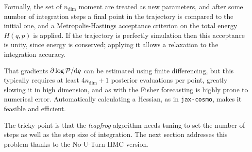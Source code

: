 \documentclass[twocolumn,twocolappendix,nofootinbib]{openjournal}
\newcommand{\jaxcosmo}{\texttt{jax-cosmo}}
\begin{document}
Formally, the set of $n_\mathrm{dim}$ moment are treated as new parameters, and after 
some number of integration steps a final point in the trajectory is compared to the initial one,
and a Metropolis-Hastings acceptance criterion on the total energy $H(q,p)$ is applied. If the trajectory is perfectly simulation then this acceptance is unity, since energy is conserved; applying it allows
a relaxation to the integration accuracy.

That gradients $\partial \log{\cal P} / \mathrm{d} q$ can be estimated using finite differencing,
but this typically requires at least $4 n_{\mathrm{dim}} + 1$ posterior evaluations per point, greatly slowing it
in high dimension, and as with the Fisher forecasting is highly prone to numerical error. Automatically
calculating a Hessian, as in \jaxcosmo, makes it feasible and efficient.

The tricky point is that the \textit{leapfrog} algorithm needs tuning to set the number of steps as well as the step size of integration. The next section addresses this problem thanks to the No-U-Turn HMC version.
\end{document}
